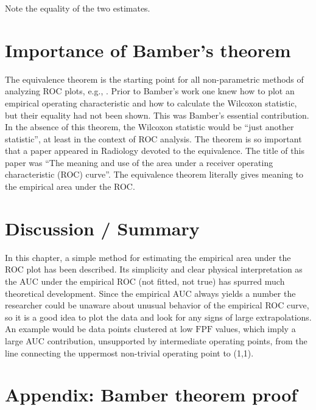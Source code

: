 \documentclass[
]{book}
\begin{document}
Note the equality of the two estimates.

\hypertarget{empirical-auc-wilcoxon-bamber-theorem-importance}{%
\section{Importance of Bamber's theorem}\label{empirical-auc-wilcoxon-bamber-theorem-importance}}

The equivalence theorem is the starting point for all non-parametric methods of analyzing ROC plots, e.g., \citep{hanley1997sampling, delong1988comparing}. Prior to Bamber's work one knew how to plot an empirical operating characteristic and how to calculate the Wilcoxon statistic, but their equality had not been shown. This was Bamber's essential contribution. In the absence of this theorem, the Wilcoxon statistic would be ``just another statistic'', at least in the context of ROC analysis. The theorem is so important that a paper appeared in Radiology \citep{hanley1982meaning} devoted to the equivalence. The title of this paper was ``The meaning and use of the area under a receiver operating characteristic (ROC) curve''. The equivalence theorem literally gives meaning to the empirical area under the ROC.

\hypertarget{empirical-auc-discussion-summary}{%
\section{Discussion / Summary}\label{empirical-auc-discussion-summary}}

In this chapter, a simple method for estimating the empirical area under the ROC plot has been described. Its simplicity and clear physical interpretation as the AUC under the empirical ROC (not fitted, not true) has spurred much theoretical development. Since the empirical AUC always yields a number the researcher could be unaware about unusual behavior of the empirical ROC curve, so it is a good idea to plot the data and look for any signs of large extrapolations. An example would be data points clustered at low \(\text{FPF}\) values, which imply a large AUC contribution, unsupported by intermediate operating points, from the line connecting the uppermost non-trivial operating point to (1,1).

\hypertarget{empirical-auc-bamber-theorem-proof}{%
\section{Appendix: Bamber theorem proof}\label{empirical-auc-bamber-theorem-proof}}
\end{document}
